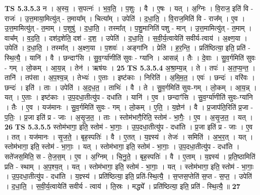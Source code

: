 \documentclass[17pt]{extarticle}
\begin{document}
                  \newline
                                \textbf{ TS 5.3.5.3} \newline
                  न । अ॒स्य॒ । स॒पत्नः॑ । भ॒व॒ति॒ । प॒शुः । वै । ए॒षः । यत् । अ॒ग्निः । वि॒राज॒ इति॑ वि - राजः॑ । उ॒त्त॒माया॒मित्यु॑त् - त॒माया᳚म् । चित्या᳚म् । उपेति॑ । द॒धा॒ति॒ । वि॒राज॒मिति॑ वि - राज᳚म् । ए॒व । उ॒त्त॒मामित्यु॑त् - त॒माम् । प॒शुषु॑ । द॒धा॒ति॒ । तस्मा᳚त् । प॒शु॒मानिति॑ पशु - मान् । उ॒त्त॒मामित्यु॑त् - त॒माम् । वाच᳚म् । व॒द॒ति॒ । दश॑द॒शेति॒ दश॑ - द॒श॒ । उपेति॑ । द॒धा॒ति॒ । स॒वी॒र्य॒त्वायेति॑ सवीर्य-त्वाय॑ । अ॒क्ष्ण॒या । उपेति॑ । द॒धा॒ति॒ । तस्मा᳚त् । अ॒क्ष्ण॒या । प॒शवः॑ । अङ्गा॑नि । प्रेति॑ । ह॒र॒न्ति॒ । प्रति॑ष्ठित्या॒ इति॒ प्रति॑ - स्थि॒त्यै॒ । यानि॑ । वै । छन्दाꣳ॑सि । सु॒व॒र्ग्या॑णीति॑ सुवः - ग्या॑नि । आसन्न्॑ । तैः । दे॒वाः । सु॒व॒र्गमिति॑ सुवः - गम् । लो॒कम् । आ॒य॒न्न् । तेन॑ । ऋष॑यः । \textbf{  25} \newline
                  \newline
                                \textbf{ TS 5.3.5.4} \newline
                  अ॒श्रा॒म्य॒न्न् । ते । तपः॑ । अ॒त॒प्य॒न्त॒ । तानि॑ । तप॑सा । अ॒प॒श्य॒न्न् । तेभ्यः॑ । ए॒ताः । इष्ट॑काः । निरिति॑ । अ॒मि॒म॒त॒ । एवः॑ । छन्दः॑ । वरि॑वः । छन्दः॑ । इति॑ । ताः । उपेति॑ । अ॒द॒ध॒त॒ । ताभिः॑ । वै । ते । सु॒व॒र्गमिति॑ सुवः-गम् । लो॒कम् । आ॒य॒न्न् । यत् । ए॒ताः । इष्ट॑काः । उ॒प॒दधा॒तीत्यु॑प - दधा॑ति । यानि॑ । ए॒व । छन्दाꣳ॑सि । सु॒व॒र्ग्या॑णीति॑ सुवः-ग्या॑नि । तैः । ए॒व । यज॑मानः । सु॒व॒र्गमिति॑ सुवः - गम् । लो॒कम् । ए॒ति॒ । य॒ज्ञेन॑ । वै । प्र॒जाप॑ति॒रिति॑ प्र॒जा - प॒तिः॒ । प्र॒जा इति॑ प्र - जाः । अ॒सृ॒ज॒त॒ । ताः । स्तोम॑भागै॒रिति॒ स्तोम॑ - भा॒गैः॒ । ए॒व । अ॒सृ॒ज॒त॒ । यत् । \textbf{  26} \newline
                  \newline
                                \textbf{ TS 5.3.5.5} \newline
                  स्तोम॑भागा॒ इति॒ स्तोम॑ - भा॒गाः॒ । उ॒प॒दधा॒तीत्यु॑प - दधा॑ति । प्र॒जा इति॑ प्र - जाः । ए॒व । तत् । यज॑मानः । सृ॒ज॒ते॒ । बृह॒स्पतिः॑ । वै । ए॒तत् । य॒ज्ञ्स्य॑ । तेजः॑ । समिति॑ । अ॒भ॒र॒त् । यत् । स्तोम॑भागा॒ इति॒ स्तोम॑ - भा॒गाः॒ । यत् । स्तोम॑भागा॒ इति॒ स्तोम॑ - भा॒गाः॒ । उ॒प॒दधा॒तीत्यु॑प - दधा॑ति । सते॑जस॒मिति॒ स - ते॒ज॒स॒म् । ए॒व । अ॒ग्निम् । चि॒नु॒ते॒ । बृह॒स्पतिः॑ । वै । ए॒ताम् । य॒ज्ञ्स्य॑ । प्र॒ति॒ष्ठामिति॑ प्रति - स्थाम् । अ॒प॒श्य॒त् । यत् । स्तोम॑भागा॒ इति॒ स्तोम॑ - भा॒गाः॒ । यत् । स्तोम॑भागा॒ इति॒ स्तोम॑ - भा॒गाः॒ । उ॒प॒दधा॒तीत्यु॑प - दधा॑ति । य॒ज्ञ्स्य॑ । प्रति॑ष्ठित्या॒ इति॒ प्रति॑-स्थि॒त्यै॒ । स॒प्तस॒प्तेति॑ स॒प्त - स॒प्त॒ । उपेति॑ । द॒धा॒ति॒ । स॒वी॒र्य॒त्वायेति॑ सवीर्य - त्वाय॑ । ति॒स्रः । मद्ध्ये᳚ । प्रति॑ष्ठित्या॒ इति॒ प्रति॑ - स्थि॒त्यै॒ ॥ \textbf{  27 } \newline
\end{document}
